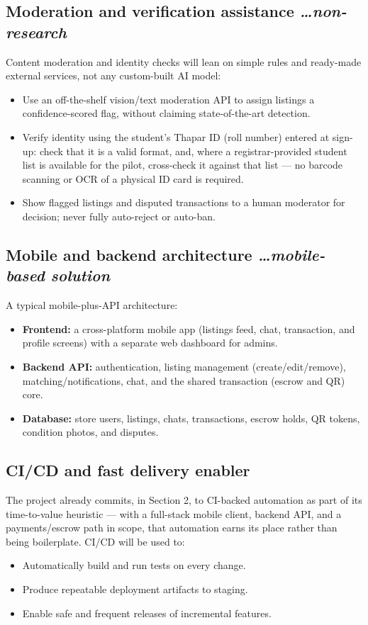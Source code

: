 \documentclass[11pt,a4paper]{article}
\newcommand{\BvrHint}[1]{%
  {\normalfont\normalsize\itshape\hfill #1}}
\begin{document}
\subsection{Moderation and verification assistance %
\BvrHint{\ldots non-research}}
Content moderation and identity checks will lean on simple rules and
ready-made external services, not any custom-built AI model:
\begin{itemize}[leftmargin=0.7cm]
    \item Use an off-the-shelf vision/text moderation API to assign listings a confidence-scored flag, without claiming state-of-the-art detection.
    \item Verify identity using the student's Thapar ID (roll number) entered at sign-up: check that it is a valid format, and, where a registrar-provided student list is available for the pilot, cross-check it against that list — no barcode scanning or OCR of a physical ID card is required.
    \item Show flagged listings and disputed transactions to a human moderator for decision; never fully auto-reject or auto-ban.
\end{itemize}

\subsection{Mobile and backend architecture %
\BvrHint{\ldots mobile-based solution}}
A typical mobile-plus-API architecture:
\begin{itemize}[leftmargin=0.7cm]
    \item \textbf{Frontend:} a cross-platform mobile app (listings feed, chat, transaction, and profile screens) with a separate web dashboard for admins.
    \item \textbf{Backend API:} authentication, listing management (create/edit/remove), matching/notifications, chat, and the shared transaction (escrow and QR) core.
    \item \textbf{Database:} store users, listings, chats, transactions, escrow holds, QR tokens, condition photos, and disputes.
\end{itemize}

\subsection{CI/CD and fast delivery enabler}
The project already commits, in Section 2, to CI-backed automation as part
of its time-to-value heuristic — with a full-stack mobile client, backend
API, and a payments/escrow path in scope, that automation earns its place
rather than being boilerplate. CI/CD will be used to:
\begin{itemize}[leftmargin=0.7cm]
    \item Automatically build and run tests on every change.
    \item Produce repeatable deployment artifacts to staging.
    \item Enable safe and frequent releases of incremental features.
\end{itemize}
\end{document}
